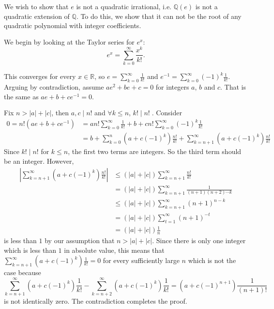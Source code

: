 \documentclass[12pt]{article}
\newcommand*{\abs}[1]{\left\lvert #1\right\rvert}
\begin{document}
We wish to show that $e$ is not a quadratic irrational, i.e. $\mathbb{Q}(e)$ is not a quadratic extension of $\mathbb{Q}$.  To do this, we show that it can not be the root of any quadratic polynomial with integer coefficients.

We begin by looking at the Taylor series for $e^x$:
\begin{equation*}
  e^x=\sum_{k=0}^{\infty}\frac{x^k}{k!}.
\end{equation*}

This converges for every $x\in\mathbb{R}$, so $e=\sum_{k=0}^{\infty}\frac{1}{k!}$ and $e^{-1}=\sum_{k=0}^{\infty}(-1)^k\frac{1}{k!}$. Arguing
by contradiction, assume $ae^2+be+c=0$ for integers
$a$, $b$ and $c$. That is the same as $ae+b+ce^{-1}=0$. 

Fix $n>\abs{a}+\abs{c}$, then $a,c\mid n!$ and $\forall k\le n$, $k!\mid n!\;$. 
Consider
\begin{align*}
0=n!(ae+b+ce^{-1})&=an!\sum_{k=0}^{\infty}\frac{1}{k!}+b+ cn!\sum_{k=0}^{\infty}(-1)^k\frac{1}{k!}\\
&=b+\sum_{k=0}^n (a+c(-1)^k)\frac{n!}{k!}+\sum_{k=n+1}^\infty (a+c(-1)^k)\frac{n!}{k!}
\end{align*}
Since $k!\mid n!$ for $k\le n$, the first two terms are integers. So the third term should be an integer. However,
\begin{align*}
\abs{\sum_{k=n+1}^\infty (a+c(-1)^k)\frac{n!}{k!}}&\le (\abs{a}+\abs{c})\sum_{k=n+1}^\infty \frac{n!}{k!}\\
&=(\abs{a}+\abs{c})\sum_{k=n+1}^\infty \frac{1}{(n+1)(n+2)\dotsb k}\\
&\le (\abs{a}+\abs{c})\sum_{k=n+1}^\infty (n+1)^{n-k}\\
&=(\abs{a}+\abs{c})\sum_{t=1}^\infty (n+1)^{-t}\\
&=(\abs{a}+\abs{c})\frac{1}{n}
\end{align*}
is less than $1$ by our assumption that $n>\abs{a}+\abs{c}$. Since there is only one integer which is less than $1$ in absolute value, this means that $\sum_{k=n+1}^\infty (a+c(-1)^k)\frac{1}{k!}=0$ for every sufficiently large $n$ which is not the case because
\begin{equation*}
\sum_{k=n+1}^\infty (a+c(-1)^k)\frac{1}{k!}-\sum_{k=n+2}^\infty (a+c(-1)^k)\frac{1}{k!}=(a+c(-1)^{n+1})\frac{1}{(n+1)!}
\end{equation*}
is not identically zero. The contradiction completes the proof.
\end{document}
